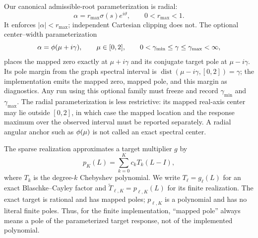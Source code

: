 Our canonical admissible-root parameterization is radial:
\begin{equation}
  \alpha=r_{\max}\sigma(s)e^{i\vartheta},
  \qquad 0<r_{\max}<1.
  \label{eq:radial-root}
\end{equation}
It enforces $|\alpha|<r_{\max}$; independent Cartesian clipping does not.
The optional center--width parameterization
\begin{equation}
  \alpha=\phi(\mu+i\gamma),
  \qquad \mu\in[0,2],
  \qquad 0<\gamma_{\min}\leq\gamma\leq\gamma_{\max}<\infty,
  \label{eq:center-width-root}
\end{equation}
places the mapped zero exactly at $\mu+i\gamma$ and its conjugate target pole
at $\mu-i\gamma$.  Its pole margin from the graph spectral interval is
$\operatorname{dist}(\mu-i\gamma,[0,2])=\gamma$; the implementation emits
the mapped zero, mapped pole, and this margin as diagnostics.  Any run using
this optional family must freeze and record $\gamma_{\min}$ and
$\gamma_{\max}$.  The radial parameterization is less restrictive: its mapped
real-axis center may lie
outside $[0,2]$, in which case the mapped location and the response maximum
over the observed interval must be reported separately.  A radial angular
anchor such as $\phi(\mu)$ is not called an exact spectral center.

The sparse realization approximates a target multiplier $g$ by
\begin{equation}
  p_K(L)=\sum_{k=0}^{K}c_k T_k(L-I),
  \label{eq:cheb-realization}
\end{equation}
where $T_k$ is the degree-$k$ Chebyshev polynomial.  We write
$T_\ell=g_\ell(L)$ for an exact Blaschke--Cayley factor and
$\widetilde T_{\ell,K}=p_{\ell,K}(L)$ for its finite realization.  The exact
target is rational and has mapped poles; $p_{\ell,K}$ is a polynomial and
has no literal finite poles.  Thus, for the finite implementation, ``mapped
pole'' always means a pole of the parameterized target response, not of the
implemented polynomial.
